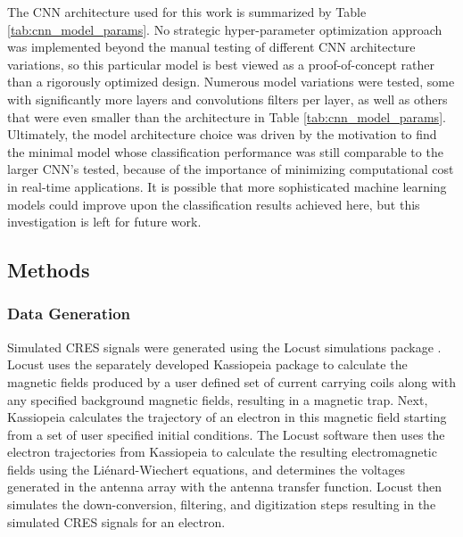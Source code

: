 The CNN architecture used for this work is summarized by Table \ref{tab:cnn_model_params}. No strategic hyper-parameter optimization approach was implemented beyond the manual testing of different CNN architecture variations, so this particular model is best viewed as a proof-of-concept rather than a rigorously optimized design. Numerous model variations were tested, some with significantly more layers and convolutions filters per layer, as well as others that were even smaller than the architecture in Table \ref{tab:cnn_model_params}. Ultimately, the model architecture choice was driven by the motivation to find the minimal model whose classification performance was still comparable to the larger CNN's tested, because of the importance of minimizing computational cost in real-time applications. It is possible that more sophisticated machine learning models could improve upon the classification results achieved here, but this investigation is left for future work.


\subsection{Methods}
\label{sec:method}

\subsubsection{Data Generation}
\label{sec:datasets}
Simulated CRES signals were generated using the Locust simulations package \cite{p8locustpaper, nb_thesis}. Locust uses the separately developed Kassiopeia package \cite{kassiopeia} to calculate the magnetic fields produced by a user defined set of current carrying coils along with any specified background magnetic fields, resulting in a magnetic trap. Next, Kassiopeia calculates the trajectory of an electron in this magnetic field starting from a set of user specified initial conditions. The Locust software then uses the electron trajectories from Kassiopeia to calculate the resulting electromagnetic fields using the Li\'{e}nard-Wiechert equations, and determines the voltages generated in the antenna array with the antenna transfer function. Locust then simulates the down-conversion, filtering, and digitization steps resulting in the simulated CRES signals for an electron.

